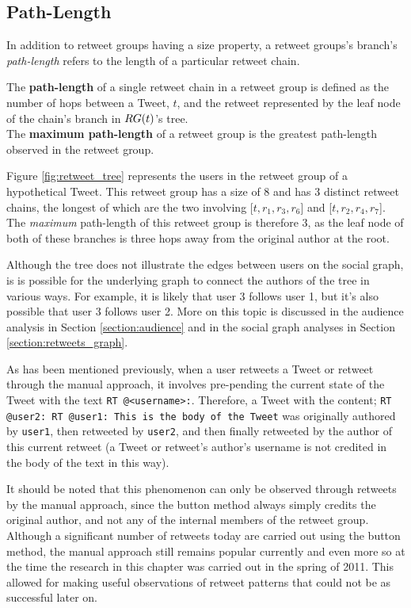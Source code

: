 \subsection{Path-Length}
In addition to retweet groups having a size property, a retweet groups's branch's \textit{path-length} refers to the length of a particular retweet chain. 

\begin{mydefinition}
The \textbf{path-length} of a single retweet chain in a retweet group is defined as the number of hops between a Tweet, $t$, and the retweet represented by the leaf node of the chain's branch in $RG(t)$'s tree.\\
The \textbf{maximum path-length} of a retweet group is the greatest path-length observed in the retweet group.
\end{mydefinition}

Figure \ref{fig:retweet_tree} represents the users in the retweet group of a hypothetical Tweet. This retweet group has a size of 8 and has 3 distinct retweet chains, the longest of which are the two involving [$t, r_1, r_3, r_6$] and [$t, r_2, r_4, r_7$]. The \textit{maximum} path-length of this retweet group is therefore 3, as the leaf node of both of these branches is three hops away from the original author at the root.

Although the tree does not illustrate the edges between users on the social graph, is is possible for the underlying graph to connect the authors of the tree in various ways. For example, it is likely that user 3 follows user 1, but it's also possible that user 3 follows user 2. More on this topic is discussed in the audience analysis in Section \ref{section:audience} and in the social graph analyses in Section  \ref{section:retweets_graph}.

As has been mentioned previously, when a user retweets a Tweet or retweet through the manual approach, it involves pre-pending the current state of the Tweet with the text \texttt{RT @<username>:}. Therefore, a Tweet with the content;\newline
\texttt{RT @user2: RT @user1: This is the body of the Tweet}\newline
was originally authored by \texttt{user1}, then retweeted by \texttt{user2}, and then finally retweeted by the author of this current retweet (a Tweet or retweet's author's username is not credited in the body of the text in this way).

It should be noted that this phenomenon can only be observed through retweets by the manual approach, since the button method always simply credits the original author, and not any of the internal members of the retweet group. Although a significant number of retweets today are carried out using the button method, the manual approach still remains popular currently and even more so at the time the research in this chapter was carried out in the spring of 2011. This allowed for making useful observations of retweet patterns that could not be as successful later on.


